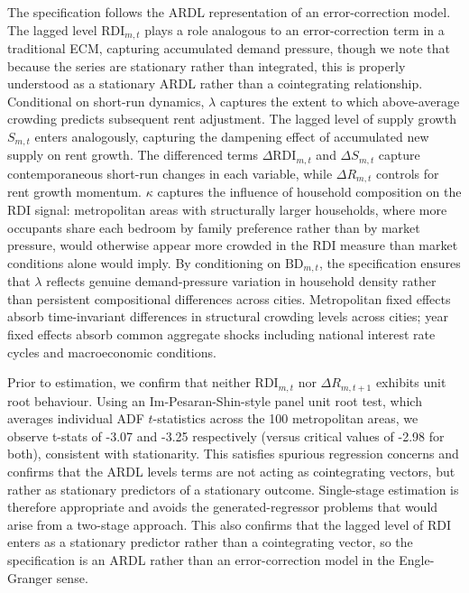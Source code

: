 \documentclass[pdflatex,sn-apa]{sn-jnl}%
\theoremstyle{thmstyleone}%
\theoremstyle{thmstyletwo}%
\theoremstyle{thmstylethree}%
\begin{document}
The specification follows the ARDL representation of an error-correction model.
The lagged level $\text{RDI}_{m,t}$ plays a role analogous to an error-correction
term in a traditional ECM, capturing accumulated demand pressure, though we
note that because the series are stationary rather than integrated, this is properly
understood as a stationary ARDL rather than a cointegrating relationship.
Conditional on short-run dynamics, $\lambda$ captures the extent to which
above-average crowding predicts subsequent rent adjustment. The lagged level of
supply growth $S_{m,t}$ enters analogously, capturing the dampening effect of
accumulated new supply on rent growth. The differenced terms $\Delta\text{RDI}_{m,t}$
and $\Delta S_{m,t}$ capture contemporaneous short-run changes in each variable,
while $\Delta R_{m,t}$ controls for rent growth momentum. $\kappa$ captures the
influence of household composition on the RDI signal: metropolitan areas with
structurally larger households, where more occupants share each bedroom by family
preference rather than by market pressure, would otherwise appear more crowded
in the RDI measure than market conditions alone would imply. By conditioning on
$\text{BD}_{m,t}$, the specification ensures that $\lambda$ reflects genuine
demand-pressure variation in household density rather than persistent compositional
differences across cities. Metropolitan fixed effects absorb time-invariant
differences in structural crowding levels across cities; year fixed effects absorb
common aggregate shocks including national interest rate cycles and macroeconomic
conditions.

Prior to estimation, we confirm that neither $\text{RDI}_{m,t}$ nor 
$\Delta R_{m,t+1}$ exhibits unit root behaviour. Using an Im-Pesaran-Shin-style 
panel unit root test, which averages individual ADF $t$-statistics across the 100 
metropolitan areas, we observe t-stats of -3.07 and -3.25 respectively (versus critical values of -2.98 for both), consistent with stationarity. This satisfies 
spurious regression concerns and confirms that the ARDL levels terms are not 
acting as cointegrating vectors, but rather as stationary predictors of a 
stationary outcome. Single-stage estimation is therefore appropriate and avoids 
the generated-regressor problems that would arise from a two-stage approach. This also confirms that the lagged level of RDI enters as a stationary predictor rather than a cointegrating vector, so the specification is an ARDL rather than an error-correction model in the Engle-Granger sense.
\end{document}
